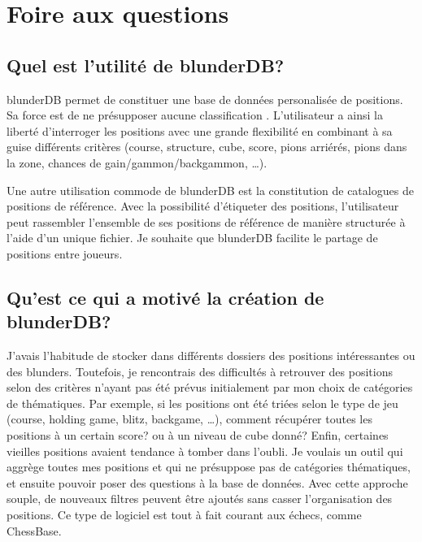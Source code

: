 \documentclass[letterpaper,10pt,french]{sphinxmanual}
\begin{document}
\sphinxstepscope


\section{Foire aux questions}
\label{\detokenize{faq:foire-aux-questions}}\label{\detokenize{faq:faq}}\label{\detokenize{faq::doc}}

\subsection{Quel est l’utilité de blunderDB?}
\label{\detokenize{faq:quel-est-l-utilite-de-blunderdb}}
\sphinxAtStartPar
blunderDB permet de constituer une base de données personalisée de
positions. Sa force est de ne présupposer aucune classification . L’utilisateur a ainsi la liberté d’interroger les
positions avec une grande flexibilité en combinant à sa guise
différents critères (course, structure, cube, score, pions arriérés,
pions dans la zone, chances de gain/gammon/backgammon, …).

\sphinxAtStartPar
Une autre utilisation commode de blunderDB est la constitution de catalogues de
positions de référence. Avec la possibilité d’étiqueter des positions,
l’utilisateur peut rassembler l’ensemble de ses positions de référence de
manière structurée à l’aide d’un unique fichier. Je souhaite que blunderDB
facilite le partage de positions entre joueurs.


\subsection{Qu’est ce qui a motivé la création de blunderDB?}
\label{\detokenize{faq:qu-est-ce-qui-a-motive-la-creation-de-blunderdb}}
\sphinxAtStartPar
J’avais l’habitude de stocker dans différents dossiers des positions
intéressantes ou des blunders. Toutefois, je rencontrais des difficultés à
retrouver des positions selon des critères n’ayant pas été prévus initialement
par mon choix de catégories de thématiques. Par exemple, si les positions ont
été triées selon le type de jeu (course, holding game, blitz, backgame, …),
comment récupérer toutes les positions à un certain score? ou à un niveau de
cube donné? Enfin, certaines vieilles positions avaient tendance à tomber dans
l’oubli. Je voulais un outil qui aggrège toutes mes positions et qui ne
présuppose pas  de catégories thématiques, et ensuite pouvoir poser
des questions à la base de données. Avec cette approche souple, de nouveaux
filtres peuvent être ajoutés sans casser l’organisation des positions. Ce type
de logiciel est tout à fait courant aux échecs, comme ChessBase.
\end{document}
